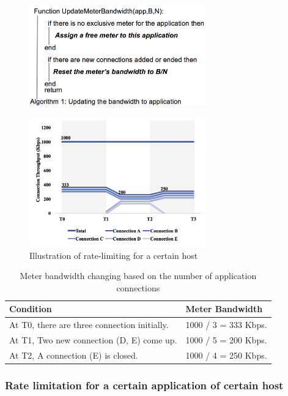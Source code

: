 \documentclass[journal]{IEEEtran}
\begin{document}
\begin{figure}[!t]
\centering
\includegraphics[width=3in]{./figures/rate_app_algo}
\label{fig:rate_app_algo}
\end{figure}

\begin{figure}[!t]
\centering
\includegraphics[width=3in]{./figures/rate_app}
\caption{Illustration of rate-limiting for a certain host}
\label{fig:rate_app}
\end{figure}

\begin{table}[]
\centering
\begin{tabular}{|l|l|}
\hline
Condition                                      & Meter Bandwidth                \\ \hline
At T0, there are three connection initially.   & 1000 / 3 = 333 Kbps.           \\ \hline
At T1, Two new connection (D, E) come up.      & 1000 / 5 = 200 Kbps.           \\ \hline
At T2, A connection (E) is closed.             & 1000 / 4 = 250 Kbps.           \\ \hline
\end{tabular}
\caption{Meter bandwidth changing based on the number of application connections}
\label{table:rate_app}
\end{table}

\subsubsection{Rate limitation for a certain application of certain host}
\end{document}
